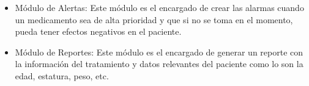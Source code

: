 \begin{itemize}
	\item Módulo de Alertas: Este módulo es el encargado de crear las alarmas cuando un medicamento sea de alta prioridad y que si no se toma en el momento, pueda tener efectos negativos en el paciente.
	
	\item Módulo de Reportes: Este módulo es el encargado de generar un reporte con la información del tratamiento y datos relevantes del paciente como lo son la edad, estatura, peso, etc.
	
	
	
	
	
\end{itemize}

